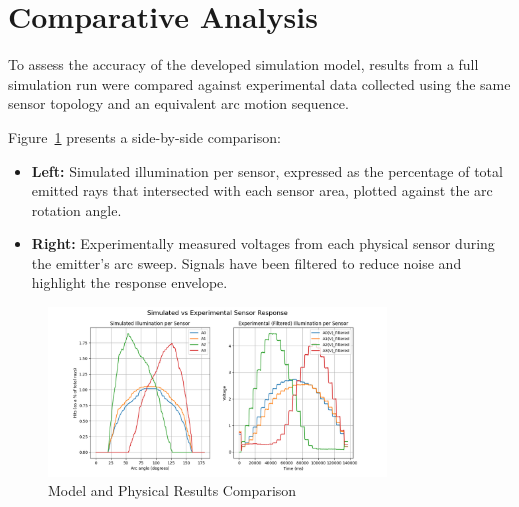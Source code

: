 \section{Comparative Analysis}

To assess the accuracy of the developed simulation model, results from a full simulation run were compared against experimental data collected using the same sensor topology and an equivalent arc motion sequence.

Figure~\ref{fig:Model and Physical Results Comparison} presents a side-by-side comparison:
\begin{itemize}
    \item \textbf{Left:} Simulated illumination per sensor, expressed as the percentage of total emitted rays that intersected with each sensor area, plotted against the arc rotation angle.
    \item \textbf{Right:} Experimentally measured voltages from each physical sensor during the emitter's arc sweep. Signals have been filtered to reduce noise and highlight the response envelope.
\end{itemize}
 
 \begin{figure}[htbp] %
    \centering
    \includegraphics[width=0.8\textwidth]{chapters/results/images/Comparison_plot.png} %
    \caption{Model and Physical Results Comparison}       %
    \label{fig:Model and Physical Results Comparison}            %
\end{figure}


